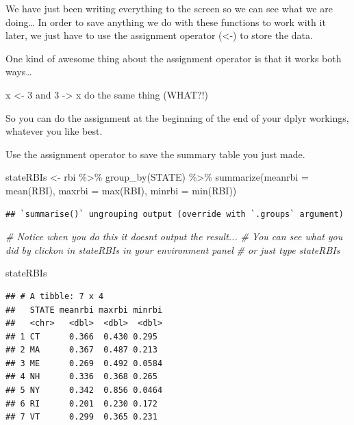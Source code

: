 \documentclass[
]{book}
\newenvironment{Shaded}{\begin{snugshade}}{\end{snugshade}}
\newcommand{\AttributeTok}[1]{\textcolor[rgb]{0.77,0.63,0.00}{#1}}
\newcommand{\CommentTok}[1]{\textcolor[rgb]{0.56,0.35,0.01}{\textit{#1}}}
\newcommand{\FunctionTok}[1]{\textcolor[rgb]{0.00,0.00,0.00}{#1}}
\newcommand{\NormalTok}[1]{#1}
\newcommand{\OtherTok}[1]{\textcolor[rgb]{0.56,0.35,0.01}{#1}}
\newcommand{\SpecialCharTok}[1]{\textcolor[rgb]{0.00,0.00,0.00}{#1}}
\begin{document}
We have just been writing everything to the screen so we can see what we are doing\ldots{} In order to save anything we do with these functions to work with it later, we just have to use the assignment operator (\textless-) to store the data.

One kind of awesome thing about the assignment operator is that it works both ways\ldots{}

x \textless- 3 and 3 -\textgreater{} x do the same thing (WHAT?!)

So you can do the assignment at the beginning of the end of your dplyr workings, whatever you like best.

Use the assignment operator to save the summary table you just made.

\begin{Shaded}
\begin{Highlighting}[]
\NormalTok{stateRBIs }\OtherTok{\textless{}{-}}\NormalTok{ rbi }\SpecialCharTok{\%\textgreater{}\%}
  \FunctionTok{group\_by}\NormalTok{(STATE) }\SpecialCharTok{\%\textgreater{}\%}
  \FunctionTok{summarize}\NormalTok{(}\AttributeTok{meanrbi =} \FunctionTok{mean}\NormalTok{(RBI), }\AttributeTok{maxrbi =} \FunctionTok{max}\NormalTok{(RBI), }\AttributeTok{minrbi =} \FunctionTok{min}\NormalTok{(RBI))}
\end{Highlighting}
\end{Shaded}

\begin{verbatim}
## `summarise()` ungrouping output (override with `.groups` argument)
\end{verbatim}

\begin{Shaded}
\begin{Highlighting}[]
\CommentTok{\# Notice when you do this it doesn\textquotesingle{}t output the result... }
\CommentTok{\# You can see what you did by clickon in stateRBIs in your environment panel}
\CommentTok{\# or just type stateRBIs}

\NormalTok{stateRBIs}
\end{Highlighting}
\end{Shaded}

\begin{verbatim}
## # A tibble: 7 x 4
##   STATE meanrbi maxrbi minrbi
##   <chr>   <dbl>  <dbl>  <dbl>
## 1 CT      0.366  0.430 0.295 
## 2 MA      0.367  0.487 0.213 
## 3 ME      0.269  0.492 0.0584
## 4 NH      0.336  0.368 0.265 
## 5 NY      0.342  0.856 0.0464
## 6 RI      0.201  0.230 0.172 
## 7 VT      0.299  0.365 0.231
\end{verbatim}
\end{document}
